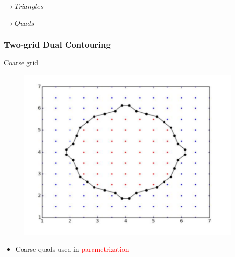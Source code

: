 \begin{frame}
\pause
\pause
\pause
\pause
\pause
\pause
\pause
\pause
\vspace{-.1cm}
\begin{minipage}[c]{0.5\linewidth}
\hspace{1cm}$\rightarrow Triangles$
\end{minipage}%
\hfill%
\begin{minipage}[c]{0.5\linewidth}
\begin{center}
	{$\rightarrow Quads$}
\end{center}
\end{minipage}
\end{frame}


\begin{frame}
\frametitle{Two-grid Dual Contouring}
\begin{overlayarea}{\textwidth}{0.9\textheight}
	\begin{minipage}{0.45\textwidth}
	\begin{block}{\centering Coarse grid}
	\vspace{-0.5cm}
	\begin{figure}
	\includegraphics[scale=0.35]{Pictures/DC/DC_1_Coarse.pdf}
	\end{figure}
	\begin{itemize}
	\item Coarse quads used in \textcolor{red}{parametrization}
	\end{itemize}
	\end{block}
	\end{minipage}
	\hfill%
	\begin{minipage}{0.45\textwidth}

\end{minipage}
\end{overlayarea}
\end{frame}
